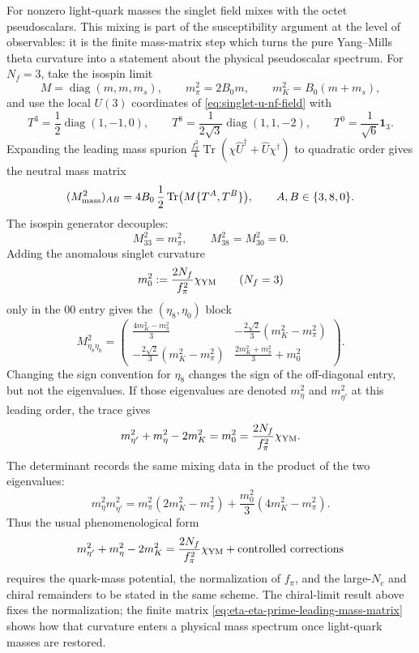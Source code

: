 For nonzero light-quark masses the singlet field mixes with the octet
pseudoscalars.  This mixing is part of the susceptibility argument at the
level of observables: it is the finite mass-matrix step which turns the pure
Yang--Mills theta curvature into a statement about the physical pseudoscalar
spectrum.
For \(N_f=3\), take the isospin limit
\[
  M=\operatorname{diag}(m,m,m_s),
  \qquad
  m_\pi^2=2B_0m,
  \qquad
  m_K^2=B_0(m+m_s),
\]
and use the local \(U(3)\) coordinates of
\eqref{eq:singlet-u-nf-field} with
\[
  T^3=\frac12\operatorname{diag}(1,-1,0),
  \qquad
  T^8=\frac1{2\sqrt3}\operatorname{diag}(1,1,-2),
  \qquad
  T^0=\frac1{\sqrt6}\mathbf 1_3 .
\]
Expanding the leading mass spurion
\(\frac{f_\pi^2}{4}\operatorname{Tr}(\chi\widehat U^\dagger+
\widehat U\chi^\dagger)\) to quadratic order gives the neutral mass matrix
\[
  (M^2_{\rm mass})_{AB}
  =
  4B_0\,\frac12
  \operatorname{Tr}\bigl(M\{T^A,T^B\}\bigr),
  \qquad A,B\in\{3,8,0\}.
\]
The isospin generator decouples:
\[
  M^2_{33}=m_\pi^2,
  \qquad
  M^2_{38}=M^2_{30}=0 .
\]
Adding the anomalous singlet curvature
\[
  m_0^2:=\frac{2N_f}{f_\pi^2}\chi_{\rm YM}
  \qquad (N_f=3)
\]
only in the \(00\) entry gives the \((\eta_8,\eta_0)\) block
\begin{equation}
  M^2_{\eta_8\eta_0}
  =
  \begin{pmatrix}
    \frac{4m_K^2-m_\pi^2}{3}
    &
    -\frac{2\sqrt{2}}{3}(m_K^2-m_\pi^2)
    \\[0.4em]
    -\frac{2\sqrt{2}}{3}(m_K^2-m_\pi^2)
    &
    \frac{2m_K^2+m_\pi^2}{3}+m_0^2
  \end{pmatrix}.
  \label{eq:eta-eta-prime-leading-mass-matrix}
\end{equation}
Changing the sign convention for \(\eta_8\) changes the sign of the off-diagonal
entry, but not the eigenvalues.  If those eigenvalues are denoted
\(m_\eta^2\) and \(m_{\eta'}^2\) at this leading order, the trace gives
\begin{equation}
  m_{\eta'}^2+m_\eta^2-2m_K^2
  =
  m_0^2
  =
  \frac{2N_f}{f_\pi^2}\chi_{\rm YM}.
  \label{eq:eta-eta-prime-trace-witten-veneziano}
\end{equation}
The determinant records the same mixing data in the product of the two
eigenvalues:
\begin{equation}
  m_\eta^2m_{\eta'}^2
  =
  m_\pi^2(2m_K^2-m_\pi^2)
  +
  \frac{m_0^2}{3}(4m_K^2-m_\pi^2).
  \label{eq:eta-eta-prime-determinant-ledger}
\end{equation}
Thus the usual phenomenological form
\[
  m_{\eta'}^2+m_\eta^2-2m_K^2
  =
  \frac{2N_f}{f_\pi^2}\chi_{\rm YM}
  +\hbox{controlled corrections}
\]
requires the quark-mass potential, the normalization of \(f_\pi\), and the
large-\(N_c\) and chiral remainders to be stated in the same scheme.  The
chiral-limit result above fixes the normalization; the finite matrix
\eqref{eq:eta-eta-prime-leading-mass-matrix} shows how that curvature enters a
physical mass spectrum once light-quark masses are restored.

